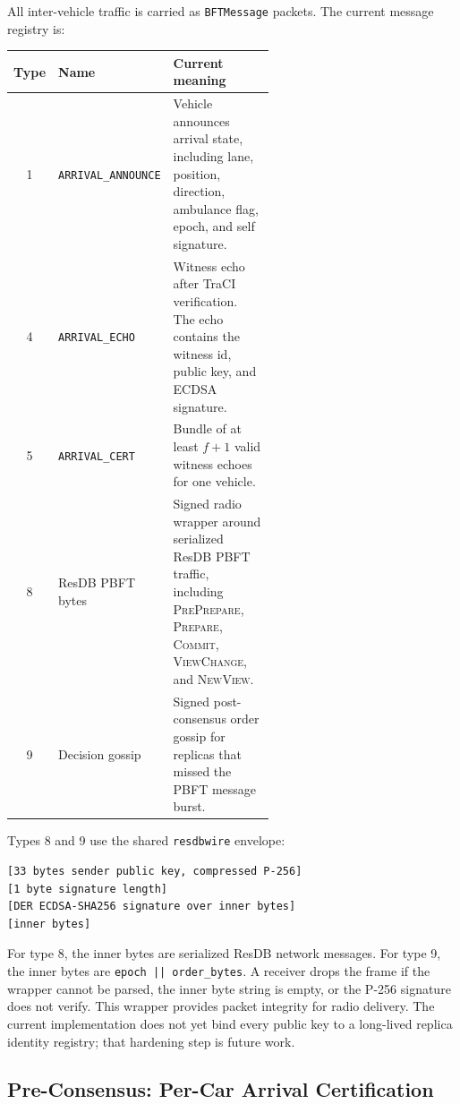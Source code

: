 \documentclass[fleqn,10pt]{olplainarticle}
\begin{document}
All inter-vehicle traffic is carried as \texttt{BFTMessage} packets. The current message registry is:

\begin{center}
\begin{tabular}{c|l|p{0.58\linewidth}}
\textbf{Type} & \textbf{Name} & \textbf{Current meaning} \\
\hline
1 & \texttt{ARRIVAL\_ANNOUNCE} & Vehicle announces arrival state, including lane, position, direction, ambulance flag, epoch, and self signature. \\
4 & \texttt{ARRIVAL\_ECHO} & Witness echo after TraCI verification. The echo contains the witness id, public key, and ECDSA signature. \\
5 & \texttt{ARRIVAL\_CERT} & Bundle of at least $f+1$ valid witness echoes for one vehicle. \\
8 & ResDB PBFT bytes & Signed radio wrapper around serialized ResDB PBFT traffic, including \textsc{PrePrepare}, \textsc{Prepare}, \textsc{Commit}, \textsc{ViewChange}, and \textsc{NewView}. \\
9 & Decision gossip & Signed post-consensus order gossip for replicas that missed the PBFT message burst. \\
\end{tabular}
\end{center}

Types 8 and 9 use the shared \texttt{resdbwire} envelope:

\begin{verbatim}
[33 bytes sender public key, compressed P-256]
[1 byte signature length]
[DER ECDSA-SHA256 signature over inner bytes]
[inner bytes]
\end{verbatim}

For type 8, the inner bytes are serialized ResDB network messages. For type 9, the inner bytes are \texttt{epoch || order\_bytes}. A receiver drops the frame if the wrapper cannot be parsed, the inner byte string is empty, or the P-256 signature does not verify. This wrapper provides packet integrity for radio delivery. The current implementation does not yet bind every public key to a long-lived replica identity registry; that hardening step is future work.

\subsection{Pre-Consensus: Per-Car Arrival Certification}
\label{subsec:arrival-certification}
\end{document}

